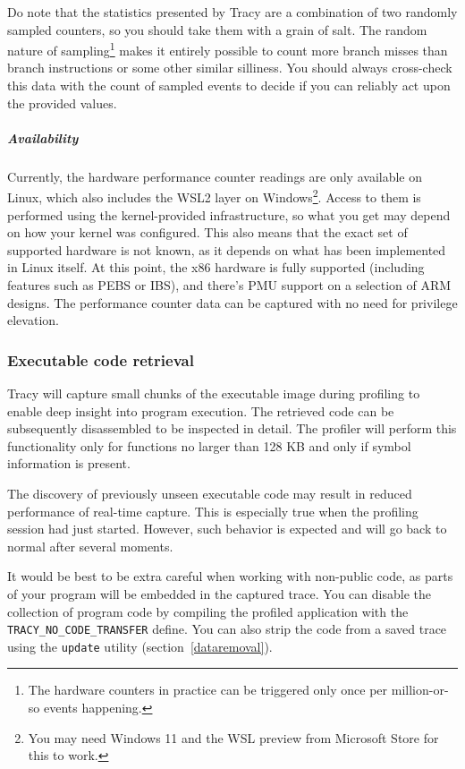 \documentclass[hidelinks,titlepage,a4paper,twoside]{article}
\begin{document}
Do note that the statistics presented by Tracy are a combination of two randomly sampled counters, so you should take them with a grain of salt. The random nature of sampling\footnote{The hardware counters in practice can be triggered only once per million-or-so events happening.} makes it entirely possible to count more branch misses than branch instructions or some other similar silliness. You should always cross-check this data with the count of sampled events to decide if you can reliably act upon the provided values.

\subparagraph{Availability}

Currently, the hardware performance counter readings are only available on Linux, which also includes the WSL2 layer on Windows\footnote{You may need Windows 11 and the WSL preview from Microsoft Store for this to work.}. Access to them is performed using the kernel-provided infrastructure, so what you get may depend on how your kernel was configured. This also means that the exact set of supported hardware is not known, as it depends on what has been implemented in Linux itself. At this point, the x86 hardware is fully supported (including features such as PEBS or IBS), and there's PMU support on a selection of ARM designs. The performance counter data can be captured with no need for privilege elevation.

\subsubsection{Executable code retrieval}
\label{executableretrieval}

Tracy will capture small chunks of the executable image during profiling to enable deep insight into program execution. The retrieved code can be subsequently disassembled to be inspected in detail. The profiler will perform this functionality only for functions no larger than 128 KB and only if symbol information is present.

The discovery of previously unseen executable code may result in reduced performance of real-time capture. This is especially true when the profiling session had just started. However, such behavior is expected and will go back to normal after several moments.

It would be best to be extra careful when working with non-public code, as parts of your program will be embedded in the captured trace. You can disable the collection of program code by compiling the profiled application with the \texttt{TRACY\_NO\_CODE\_TRANSFER} define. You can also strip the code from a saved trace using the \texttt{update} utility (section~\ref{dataremoval}).
\end{document}
